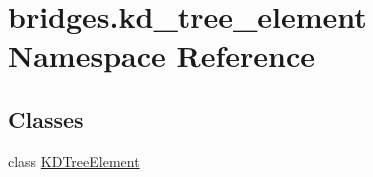 \hypertarget{namespacebridges_1_1kd__tree__element}{}\section{bridges.\+kd\+\_\+tree\+\_\+element Namespace Reference}
\label{namespacebridges_1_1kd__tree__element}
\subsection*{Classes}
\begin{DoxyCompactItemize}
\item 
class \hyperlink{classbridges_1_1kd__tree__element_1_1_k_d_tree_element}{K\+D\+Tree\+Element}
\end{DoxyCompactItemize}
